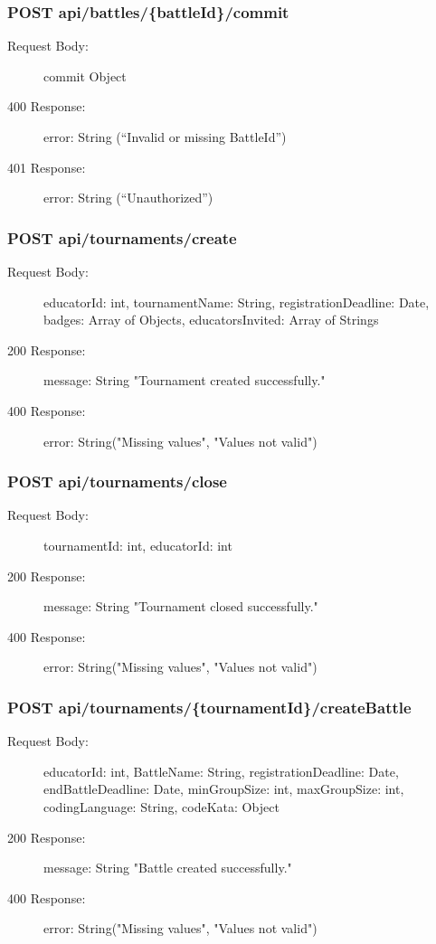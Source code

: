 \documentclass{Configuration_Files/Template}
\begin{document}
\subsubsection{POST api/battles/\{battleId\}/commit}
\begin{description}
    \item[Request Body:] commit Object
    \item[400 Response:] error: String (“Invalid or missing BattleId”)
    \item[401 Response:] error: String (“Unauthorized”)
\end{description}

\subsubsection{POST api/tournaments/create}
\begin{description}
    \item[Request Body:] educatorId: int, tournamentName: String, registrationDeadline: Date, badges: Array of Objects, educatorsInvited: Array of Strings
    \item[200 Response:] message: String "Tournament created successfully."
    \item[400 Response:] error: String("Missing values", "Values not valid")
\end{description}

\subsubsection{POST api/tournaments/close}
\begin{description}
    \item[Request Body:] tournamentId: int, educatorId: int
    \item[200 Response:] message: String "Tournament closed successfully."
    \item[400 Response:] error: String("Missing values", "Values not valid")
\end{description}

\subsubsection{POST api/tournaments/\{tournamentId\}/createBattle}
\begin{description}
    \item[Request Body:] educatorId: int, BattleName: String, registrationDeadline: Date, endBattleDeadline: Date, minGroupSize: int, maxGroupSize: int, codingLanguage: String, codeKata: Object
    \item[200 Response:] message: String "Battle created successfully."
    \item[400 Response:] error: String("Missing values", "Values not valid")
\end{description}
\end{document}
